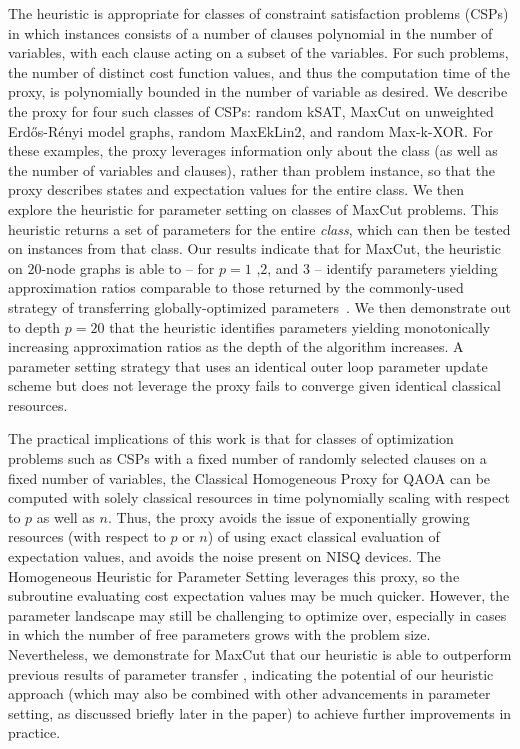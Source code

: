 \documentclass[superscriptaddress,pra,aps,10pt,longbibliography,notitlepage]{revtex4-1}
\begin{document}
The heuristic is appropriate for classes of constraint satisfaction problems (CSPs) in which instances consists of a number of clauses polynomial in the number of variables, with each clause acting on a subset of the variables. For such problems, the number of distinct cost function values, and thus the computation time of the proxy, is polynomially bounded in the number of variable as desired. We describe the proxy for four such classes of CSPs: random kSAT, MaxCut on unweighted Erd\H{o}s-R\'{e}nyi model graphs, random MaxEkLin2, and random Max-k-XOR. For these examples, the proxy leverages information only about the class (as well as the number of variables and clauses), rather than problem instance, so that the proxy describes states and expectation values for the entire class. We then explore the heuristic for parameter setting on classes of MaxCut problems. This heuristic returns a set of parameters for the entire \textit{class}, which can then be tested on instances from that class. Our results indicate that for MaxCut, the heuristic on $20$-node graphs is able to -- for $p=1$ ,$2$, and $3$ -- identify parameters yielding approximation ratios comparable to those returned by the commonly-used strategy of transferring globally-optimized parameters~\cite{lotshaw21,shaydulin21_qaoakit}. We then demonstrate out to depth $p=20$ that the heuristic identifies parameters yielding monotonically increasing approximation ratios as the depth of the algorithm increases. A parameter setting strategy that uses an identical outer loop parameter update scheme but does not leverage the proxy fails to converge given identical classical resources. 

The practical implications of this work is that for classes of optimization problems such as CSPs with a fixed number of randomly selected clauses on a fixed number of variables, the Classical Homogeneous Proxy for QAOA can be computed with solely classical resources in time polynomially scaling with respect to $p$ as well as $n$. Thus, the proxy avoids the issue of exponentially growing resources (with respect to $p$ or $n$) of using exact classical evaluation of expectation values, and avoids the noise present on NISQ devices. The Homogeneous Heuristic for Parameter Setting leverages this proxy, so the subroutine evaluating cost expectation values may be much quicker. However, the parameter landscape may still be challenging to optimize over, especially in cases in which the number of free parameters grows with the problem size. Nevertheless, we demonstrate for MaxCut that our heuristic is able to outperform previous results of parameter transfer \cite{lotshaw21}, indicating the potential of our heuristic approach (which may also be combined with other advancements in parameter setting, as discussed briefly later in the paper) to achieve further improvements in practice.
\end{document}
